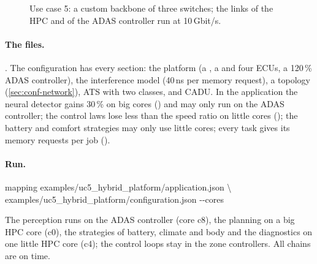 \begin{figure}[ht]
\centering
{}
\caption{Use case 5: a custom backbone of three switches; the links of
the HPC and of the ADAS controller run at 10\,Gbit/s.}
\label{fig:uc5}
\end{figure}

\paragraph{The files.} . The
configuration has every section: the platform (a , a
 and four  ECUs, a 120\,\% ADAS controller), the
interference model (40\,ns per memory request), a  topology
(\cref{sec:conf-network}), ATS with two classes, and CADU. In the
application the neural detector gains 30\,\% on big cores
() and may only run on the ADAS
controller; the control laws lose less than the speed ratio on little
cores (); the battery and comfort strategies may
only use little cores; every task gives its memory requests per job
().

\paragraph{Run.}
\begin{shell}
mapping examples/uc5\_hybrid\_platform/application.json \textbackslash\\
\quad examples/uc5\_hybrid\_platform/configuration.json -{}-cores
\end{shell}
The perception runs on the ADAS controller (core c8), the planning on a
big HPC core (c0), the strategies of battery, climate and body and the
diagnostics on one little HPC core (c4); the control loops stay in the
zone controllers. All chains are on time.

